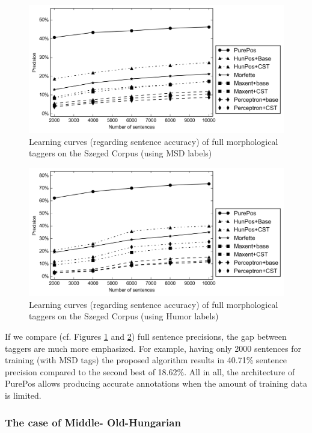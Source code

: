 \begin{figure}[H]
  \centering
  \includegraphics[width=1\textwidth]{MorphTagging/msd_sent.png} 
  \caption{Learning curves (regarding sentence accuracy) of full morphological taggers on the Szeged Corpus (using MSD labels)}
  \label{fig:msd-sent}
\end{figure}

\begin{figure}[H]
  \centering
  \includegraphics[width=1\textwidth]{MorphTagging/humor_sent.png}
  \caption{Learning curves (regarding sentence accuracy) of full morphological taggers on the Szeged Corpus (using Humor labels)}
  \label{fig:humor-sent}
\end{figure}

If we compare (cf. Figures \ref{fig:msd-sent} and \ref{fig:humor-sent}) full sentence precisions, the gap between taggers are much more emphasized. 
For example, having only 2000 sentences for training (with MSD tags) the proposed algorithm results in 40.71\% sentence precision compared to the second best of 18.62\%.
All in all, the architecture of PurePos allows producing accurate annotations when the amount of training data is limited. 

\subsubsection{The case of Middle- Old-Hungarian}
\label{sec:oldhungarian}

